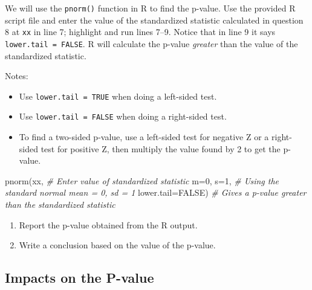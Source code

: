 \documentclass[
]{report}
\newenvironment{Shaded}{\begin{snugshade}}{\end{snugshade}}
\newcommand{\AttributeTok}[1]{\textcolor[rgb]{0.77,0.63,0.00}{#1}}
\newcommand{\CommentTok}[1]{\textcolor[rgb]{0.56,0.35,0.01}{\textit{#1}}}
\newcommand{\ConstantTok}[1]{\textcolor[rgb]{0.00,0.00,0.00}{#1}}
\newcommand{\DecValTok}[1]{\textcolor[rgb]{0.00,0.00,0.81}{#1}}
\newcommand{\FunctionTok}[1]{\textcolor[rgb]{0.00,0.00,0.00}{#1}}
\newcommand{\NormalTok}[1]{#1}
\providecommand{\tightlist}{%
  \setlength{\itemsep}{0pt}\setlength{\parskip}{0pt}}
\begin{document}
\vspace{.8in}

We will use the \texttt{pnorm()} function in R to find the p-value. Use the provided R script file and enter the value of the standardized statistic calculated in question 8 at \texttt{xx} in line 7; highlight and run lines 7--9. Notice that in line 9 it says \texttt{lower.tail\ =\ FALSE}. R will calculate the p-value \emph{greater} than the value of the standardized statistic.

Notes:

\begin{itemize}
\tightlist
\item
  Use \texttt{lower.tail\ =\ TRUE} when doing a left-sided test.
\item
  Use \texttt{lower.tail\ =\ FALSE} when doing a right-sided test.
\item
  To find a two-sided p-value, use a left-sided test for negative Z or a right-sided test for positive Z, then multiply the value found by 2 to get the p-value.
\end{itemize}

\begin{Shaded}
\begin{Highlighting}[]
\FunctionTok{pnorm}\NormalTok{(xx, }\CommentTok{\# Enter value of standardized statistic}
      \AttributeTok{m=}\DecValTok{0}\NormalTok{, }\AttributeTok{s=}\DecValTok{1}\NormalTok{, }\CommentTok{\# Using the standard normal mean = 0, sd = 1}
      \AttributeTok{lower.tail=}\ConstantTok{FALSE}\NormalTok{) }\CommentTok{\# Gives a p{-}value greater than the standardized statistic}
\end{Highlighting}
\end{Shaded}

\begin{enumerate}
\def\labelenumi{\arabic{enumi}.}
\setcounter{enumi}{10}
\item
  Report the p-value obtained from the R output.
  \vspace{0.3in}
\item
  Write a conclusion based on the value of the p-value.
  \newpage
\end{enumerate}

\hypertarget{impacts-on-the-p-value}{%
\subsection*{Impacts on the P-value}\label{impacts-on-the-p-value}}
\end{document}
